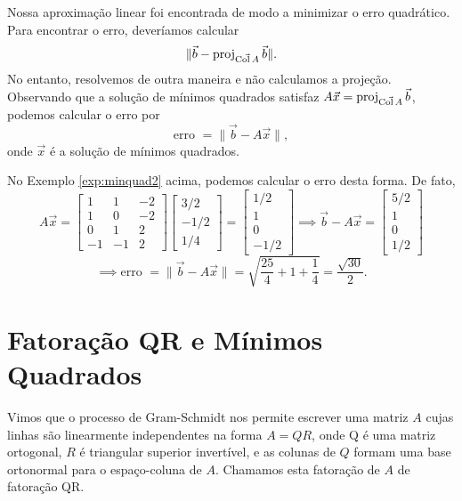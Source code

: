 \documentclass[../livro.tex]{subfiles}  %
\begin{document}
Nossa aproximação linear foi encontrada de modo a minimizar o erro quadrático. Para encontrar o erro, deveríamos calcular
\begin{equation}
\| \vec{b} - \operatorname{proj}_{\vec{\operatorname{Col} A}} \vec{b} \|.
\end{equation} No entanto, resolvemos de outra maneira e não calculamos a projeção. Observando que a solução de mínimos quadrados satisfaz $A \vec{x} = \operatorname{proj}_{\vec{\operatorname{Col} A}} \vec{b}$, podemos calcular o erro por
\begin{equation}
\text{erro } = \| \vec{b} - A \vec{x} \|,
\end{equation} onde $\vec{x}$ é a solução de mínimos quadrados.

No Exemplo \ref{exp:minquad2} acima, podemos calcular o erro desta forma. De fato,
\begin{equation}
A \vec{x} = 
\begin{bmatrix}
  1 & 1 & -2 \\ 
  1 & 0 & -2 \\ 
  0 & 1 &  2 \\ 
  -1 & -1&  2
\end{bmatrix}
\begin{bmatrix}
  3/2 \\ -1/2 \\ 1/4
\end{bmatrix} = 
\begin{bmatrix}
  1/2 \\ 1 \\ 0 \\ -1/2
\end{bmatrix} \implies 
\vec{b} - A\vec{x} = 
\begin{bmatrix}
  5/2 \\ 1 \\ 0 \\ 1/2
\end{bmatrix}
\end{equation}
\begin{equation}
\implies \text{erro } = \| \vec{b} - A \vec{x} \| = \sqrt{\frac{25}{4} + 1 + \frac{1}{4}} = \frac{\sqrt{30}}{2}.
\end{equation}



\section{Fatoração QR e Mínimos Quadrados}

Vimos que o processo de Gram-Schmidt nos permite escrever uma matriz $A$ cujas linhas são linearmente independentes na forma $A=QR$, onde Q é uma matriz ortogonal, $R$ é triangular superior invertível, e as colunas de $Q$ formam uma base ortonormal para o espaço-coluna de $A$. Chamamos esta fatoração de $A$ de fatoração QR. 
\end{document}
